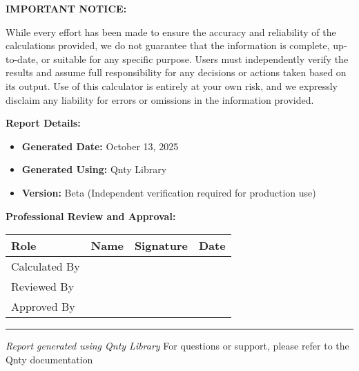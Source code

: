 \documentclass[11pt,a4paper]{article}
\begin{document}
\noindent\textbf{IMPORTANT NOTICE:}

\noindent While every effort has been made to ensure the accuracy and reliability of the calculations provided, we do not guarantee that the information is complete, up-to-date, or suitable for any specific purpose. Users must independently verify the results and assume full responsibility for any decisions or actions taken based on its output. Use of this calculator is entirely at your own risk, and we expressly disclaim any liability for errors or omissions in the information provided.

\vspace{1em}

\noindent\textbf{Report Details:}
\begin{itemize}
\item \textbf{Generated Date:} October 13, 2025
\item \textbf{Generated Using:} Qnty Library
\item \textbf{Version:} Beta (Independent verification required for production use)
\end{itemize}

\vspace{2em}

\noindent\textbf{Professional Review and Approval:}

\vspace{1em}

\begin{longtable}{|p{3cm}|p{4cm}|p{4cm}|p{2.5cm}|}
\hline
\textbf{Role} & \textbf{Name} & \textbf{Signature} & \textbf{Date} \\
\hline
\hline
Calculated By & \rule{0pt}{1.5cm} & & \\
\hline
Reviewed By & \rule{0pt}{1.5cm} & & \\
\hline
Approved By & \rule{0pt}{1.5cm} & & \\
\hline
\end{longtable}

\vspace{1em}

\begin{center}
\rule{\textwidth}{0.4pt}
\vspace{0.5em}
\textit{Report generated using Qnty Library}
\vspace{0.5em}
{\footnotesize For questions or support, please refer to the Qnty documentation}
\end{center}
\end{document}
